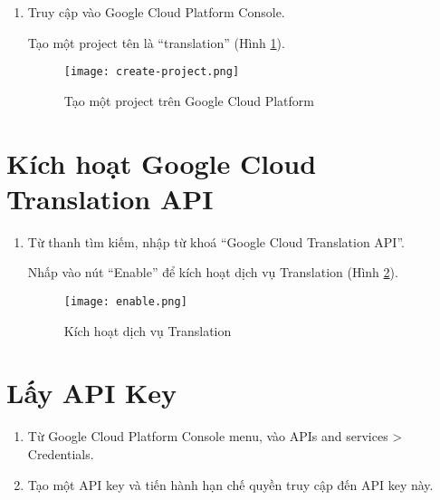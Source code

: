 \documentclass[../thesis.tex]{subfiles}
\begin{document}
\begin{enumerate}
	\item Truy cập vào Google Cloud Platform Console.
	\begin{item}
	Tạo một project tên là ``translation'' (Hình \ref{Tao mot project tren Google Cloud Platform}).
	\begin{figure}
		\texttt{[image: create-project.png]}
		\caption{Tạo một project trên Google Cloud Platform}
		\label{Tao mot project tren Google Cloud Platform}
	\end{figure}
	\end{item}
\end{enumerate}

\section{Kích hoạt Google Cloud Translation API}
\begin{enumerate}
	\item Từ thanh tìm kiếm, nhập từ khoá ``Google Cloud Translation API''.
	\begin{item}
	Nhấp vào nút ``Enable'' để kích hoạt dịch vụ Translation (Hình \ref{Kich hoat dich vu Translation}).
	\begin{figure}
		\texttt{[image: enable.png]}
		\caption{Kích hoạt dịch vụ Translation}
		\label{Kich hoat dich vu Translation}
	\end{figure}
	\end{item}
\end{enumerate}


\section{Lấy API Key}
\begin{enumerate}
	\item Từ Google Cloud Platform Console menu, vào APIs and services > Credentials.
	\item Tạo một API key và tiến hành hạn chế quyền truy cập đến API key này.
\end{enumerate}
\end{document}

